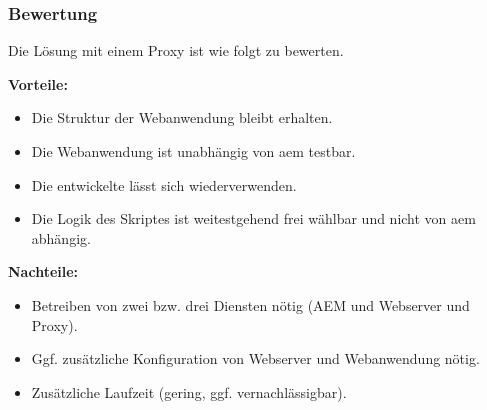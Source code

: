 \subsubsection{Bewertung}
Die Lösung mit einem Proxy ist wie folgt zu bewerten.

\begin{minipage}[t]{0.5\textwidth}
	\textbf{Vorteile:}
	\begin{itemize}
		\item Die Struktur der Webanwendung bleibt erhalten.
		\item Die Webanwendung ist unabhängig von \ac{aem} testbar.
		\item Die entwickelte \ajc lässt sich wiederverwenden.
		\item Die Logik des Skriptes ist weitestgehend frei wählbar und nicht von \ac{aem} abhängig.
	\end{itemize}
\end{minipage}
\begin{minipage}[t]{0.5\textwidth}
	\textbf{Nachteile:}
	\begin{itemize}
		\item Betreiben von zwei bzw. drei Diensten nötig (AEM und Webserver und Proxy).
		\item Ggf. zusätzliche Konfiguration von Webserver und Webanwendung nötig.
		\item Zusätzliche Laufzeit (gering, ggf. vernachlässigbar).
	\end{itemize}
\end{minipage}
